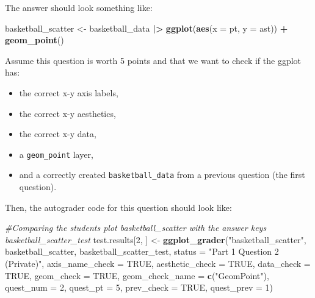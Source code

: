 \documentclass[
  12pt,
]{book}
\newenvironment{Shaded}{\begin{snugshade}}{\end{snugshade}}
\newcommand{\AttributeTok}[1]{\textcolor[rgb]{0.13,0.29,0.53}{#1}}
\newcommand{\CommentTok}[1]{\textcolor[rgb]{0.56,0.35,0.01}{\textit{#1}}}
\newcommand{\ConstantTok}[1]{\textcolor[rgb]{0.56,0.35,0.01}{#1}}
\newcommand{\DecValTok}[1]{\textcolor[rgb]{0.00,0.00,0.81}{#1}}
\newcommand{\FunctionTok}[1]{\textcolor[rgb]{0.13,0.29,0.53}{\textbf{#1}}}
\newcommand{\NormalTok}[1]{#1}
\newcommand{\OtherTok}[1]{\textcolor[rgb]{0.56,0.35,0.01}{#1}}
\newcommand{\SpecialCharTok}[1]{\textcolor[rgb]{0.81,0.36,0.00}{\textbf{#1}}}
\newcommand{\StringTok}[1]{\textcolor[rgb]{0.31,0.60,0.02}{#1}}
\providecommand{\tightlist}{%
  \setlength{\itemsep}{0pt}\setlength{\parskip}{0pt}}
\begin{document}
The answer should look something like:

\begin{Shaded}
\begin{Highlighting}[]
\NormalTok{basketball\_scatter }\OtherTok{\textless{}{-}}\NormalTok{ basketball\_data }\SpecialCharTok{|\textgreater{}} 
  \FunctionTok{ggplot}\NormalTok{(}\FunctionTok{aes}\NormalTok{(}\AttributeTok{x =}\NormalTok{ pt, }\AttributeTok{y =}\NormalTok{ ast)) }\SpecialCharTok{+}
  \FunctionTok{geom\_point}\NormalTok{()}
\end{Highlighting}
\end{Shaded}

Assume this question is worth 5 points and that we want to check if the ggplot has:

\begin{itemize}
\tightlist
\item
  the correct x-y axis labels,
\item
  the correct x-y aesthetics,
\item
  the correct x-y data,
\item
  a \texttt{geom\_point} layer,
\item
  and a correctly created \texttt{basketball\_data} from a previous question (the first question).
\end{itemize}

Then, the autograder code for this question should look like:

\begin{Shaded}
\begin{Highlighting}[]
\CommentTok{\#Comparing the student\textquotesingle{}s plot \textasciigrave{}basketball\_scatter\textasciigrave{} with the answer key\textquotesingle{}s \textasciigrave{}basketball\_scatter\_test\textasciigrave{} }
\NormalTok{test.results[}\DecValTok{2}\NormalTok{, ] }\OtherTok{\textless{}{-}} \FunctionTok{ggplot\_grader}\NormalTok{(}\StringTok{"basketball\_scatter"}\NormalTok{, basketball\_scatter, basketball\_scatter\_test,}
                                    \AttributeTok{status =} \StringTok{"Part 1 Question 2 (Private)"}\NormalTok{, }\AttributeTok{axis\_name\_check =} \ConstantTok{TRUE}\NormalTok{, }
                                    \AttributeTok{aesthetic\_check =} \ConstantTok{TRUE}\NormalTok{, }\AttributeTok{data\_check =} \ConstantTok{TRUE}\NormalTok{,}
                                    \AttributeTok{geom\_check =} \ConstantTok{TRUE}\NormalTok{, }\AttributeTok{geom\_check\_name =} \FunctionTok{c}\NormalTok{(}\StringTok{"GeomPoint"}\NormalTok{), }
                                    \AttributeTok{quest\_num =} \DecValTok{2}\NormalTok{, }\AttributeTok{quest\_pt =} \DecValTok{5}\NormalTok{, }\AttributeTok{prev\_check =} \ConstantTok{TRUE}\NormalTok{, }\AttributeTok{quest\_prev =} \DecValTok{1}\NormalTok{)}
\end{Highlighting}
\end{Shaded}
\end{document}
